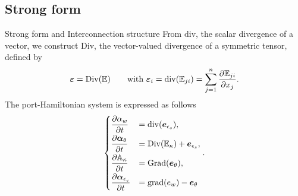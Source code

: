 \documentclass{beamer}
\begin{document}
\subsection{Strong form}

\begin{frame}{Strong form and Interconnection structure}
From $\mathrm{div}$, the scalar divergence of a vector, we construct $\mathrm{Div}$, the vector-valued divergence of a symmetric tensor, defined by
\begin{equation*}
\bm{\varepsilon} = \mathrm{Div}(\mathbb{E})  \qquad \text{with } \bm{\varepsilon}_i = \mathrm{div}(\mathbb{E}_{ji}) = \sum_{j = 1}^n \diffp{\mathbb{E}_{ji}}{x_j}.
\end{equation*}
The port-Hamiltonian system is expressed as follows 
\begin{equation*}
\begin{cases}
\displaystyle\diffp{\alpha_w}{t} &= \mathrm{div}(\bm{e}_{\epsilon_s}), \vspace{1mm} \\
\displaystyle\diffp{\bm\alpha_\theta}{t} &= \mathrm{Div}( \mathbb{E}_{\kappa}) + \bm{e}_{\epsilon_s}, \vspace{1mm} \\
\displaystyle\diffp{\mathbb{A}_\kappa}{t} &= \mathrm{Grad}(\bm{e}_{\theta}), \vspace{1mm} \\
\displaystyle\diffp{ \bm\alpha_{\epsilon_s} }{t} &= \mathrm{grad}(e_w) - \bm{e}_{\theta} \\
\end{cases}.
\end{equation*}

\end{frame}
\end{document}
